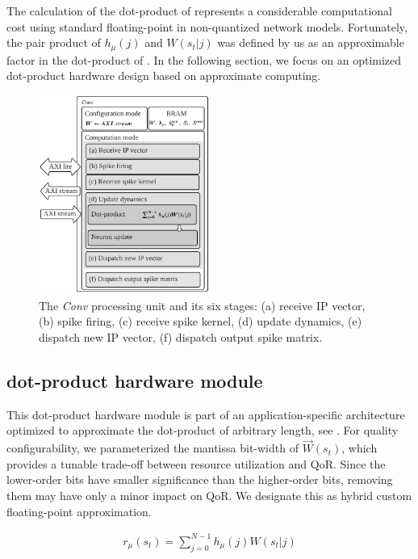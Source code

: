 The calculation of the dot-product of  represents a considerable computational cost using standard floating-point in non-quantized network models. Fortunately, the pair product of $h_{\mu}(j)$ and $W(s_t|j)$ was defined by us as an approximable factor in the dot-product of . In the following section, we focus on an optimized dot-product hardware design based on approximate computing.


\begin{figure}[t!]
	\centering
	\includegraphics[width=0.5\textwidth]{../figures/sbs_conv.pdf}
	\caption{The \emph{Conv} processing unit and its six stages: (a) receive IP vector, (b) spike firing, (c) receive spike kernel, (d) update dynamics, (e) dispatch new IP vector, (f) dispatch output spike matrix.}
	\label{fig:hw_conv}
\end{figure}

\subsection{dot-product hardware module}
This dot-product hardware module is part of an application-specific architecture optimized to approximate the dot-product of arbitrary length, see . For quality configurability, we parameterized the mantissa bit-width of $\vec{W}(s_t)$, which provides a tunable trade-off between resource utilization and QoR. Since the lower-order bits have smaller significance than the higher-order bits, removing them may have only a minor impact on QoR. We designate this as hybrid custom floating-point approximation.

\begin{eqnarray} \label{eq:dot_product}
r_{\mu}\left(s_t\right)=\sum_{j=0}^{N-1}h_{\mu}(j)W(s_t|j)
\end{eqnarray}

